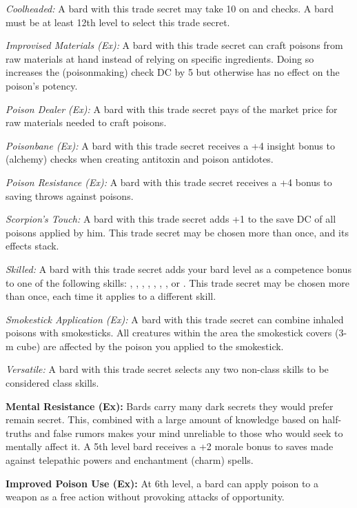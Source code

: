 \textit{Coolheaded:} A bard with this trade secret may take 10 on  and  checks. A bard must be at least 12th level to select this trade secret.

\textit{Improvised Materials (Ex):} A bard with this trade secret can craft poisons from raw materials at hand instead of relying on specific ingredients. Doing so increases the  (poisonmaking) check DC by 5 but otherwise has no effect on the poison's potency.

\textit{Poison Dealer (Ex):} A bard with this trade secret pays \onehalf of the market price for raw materials needed to craft poisons.

\textit{Poisonbane (Ex):} A bard with this trade secret receives a +4 insight bonus to  (alchemy) checks when creating antitoxin and poison antidotes.

\textit{Poison Resistance (Ex):} A bard with this trade secret receives a +4 bonus to saving throws against poisons.

\textit{Scorpion's Touch:} A bard with this trade secret adds +1 to the save DC of all poisons applied by him. This trade secret may be chosen more than once, and its effects stack.

\textit{Skilled:} A bard with this trade secret adds \onequarter your bard level as a competence bonus to one of the following skills: , , , , , , ,  or . This trade secret may be chosen more than once, each time it applies to a different skill.

\textit{Smokestick Application (Ex):} A bard with this trade secret can combine inhaled poisons with smokesticks. All creatures within the area the smokestick covers (3-m cube) are affected by the poison you applied to the smokestick.

\textit{Versatile:} A bard with this trade secret selects any two non-class skills to be considered class skills.


\textbf{Mental Resistance (Ex):} Bards carry many dark secrets they would prefer remain secret. This, combined with a large amount of knowledge based on half-truths and false rumors makes your mind unreliable to those who would seek to mentally affect it. A 5th level bard receives a +2 morale bonus to saves made against telepathic powers and enchantment (charm) spells.

\textbf{Improved Poison Use (Ex):} At 6th level, a bard can apply poison to a weapon as a free action without provoking attacks of opportunity.

